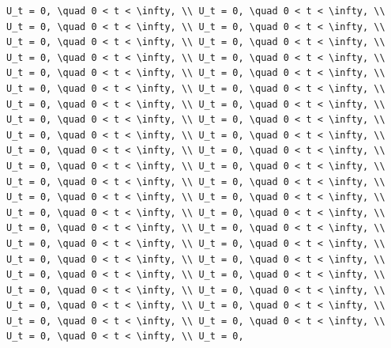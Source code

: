 \documentclass[
  ukrainian,
]{article}
\begin{document}
\begin{verbatim}
U_t = 0, \quad 0 < t < \infty, \\ U_t = 0, \quad 0 < t < \infty, \\ U_t = 0, \quad 0 < t < \infty, \\ U_t = 0, \quad 0 < t < \infty, \\ U_t = 0, \quad 0 < t < \infty, \\ U_t = 0, \quad 0 < t < \infty, \\ U_t = 0, \quad 0 < t < \infty, \\ U_t = 0, \quad 0 < t < \infty, \\ U_t = 0, \quad 0 < t < \infty, \\ U_t = 0, \quad 0 < t < \infty, \\ U_t = 0, \quad 0 < t < \infty, \\ U_t = 0, \quad 0 < t < \infty, \\ U_t = 0, \quad 0 < t < \infty, \\ U_t = 0, \quad 0 < t < \infty, \\ U_t = 0, \quad 0 < t < \infty, \\ U_t = 0, \quad 0 < t < \infty, \\ U_t = 0, \quad 0 < t < \infty, \\ U_t = 0, \quad 0 < t < \infty, \\ U_t = 0, \quad 0 < t < \infty, \\ U_t = 0, \quad 0 < t < \infty, \\ U_t = 0, \quad 0 < t < \infty, \\ U_t = 0, \quad 0 < t < \infty, \\ U_t = 0, \quad 0 < t < \infty, \\ U_t = 0, \quad 0 < t < \infty, \\ U_t = 0, \quad 0 < t < \infty, \\ U_t = 0, \quad 0 < t < \infty, \\ U_t = 0, \quad 0 < t < \infty, \\ U_t = 0, \quad 0 < t < \infty, \\ U_t = 0, \quad 0 < t < \infty, \\ U_t = 0, \quad 0 < t < \infty, \\ U_t = 0, \quad 0 < t < \infty, \\ U_t = 0, \quad 0 < t < \infty, \\ U_t = 0, \quad 0 < t < \infty, \\ U_t = 0, \quad 0 < t < \infty, \\ U_t = 0, \quad 0 < t < \infty, \\ U_t = 0, \quad 0 < t < \infty, \\ U_t = 0, \quad 0 < t < \infty, \\ U_t = 0, \quad 0 < t < \infty, \\ U_t = 0, \quad 0 < t < \infty, \\ U_t = 0, \quad 0 < t < \infty, \\ U_t = 0, \quad 0 < t < \infty, \\ U_t = 0, \quad 0 < t < \infty, \\ U_t = 0, \quad 0 < t < \infty, \\ U_t = 0, 
\end{verbatim}
\end{document}
